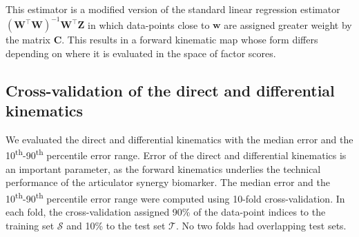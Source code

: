 \documentclass[preprint]{JASAnew}\usepackage[]{graphicx}\usepackage[]{color}
\begin{document}
This estimator is a modified version of the standard linear regression estimator $\left( \mathbf{W}^\intercal \mathbf{W} \right)^{-1} \mathbf{W}^\intercal \mathbf{Z}$ in which data-points close to $\mathbf{w}$ are assigned greater weight by the matrix $\mathbf{C}$. This results in a forward kinematic map whose form differs depending on where it is evaluated in the space of factor scores.










\subsection{Cross-validation of the direct and differential kinematics}
\label{subsec:crossval}

We evaluated the direct and differential kinematics with the median error and the 10\textsuperscript{th}-90\textsuperscript{th} percentile error range.
%
Error of the direct and differential kinematics is an important parameter, as the forward kinematics underlies the technical performance of the articulator synergy biomarker.
%
The median error and the 10\textsuperscript{th}-90\textsuperscript{th} percentile error range were computed using \num{10}-fold cross-validation. 
%
In each fold, the cross-validation assigned 90\% of the data-point indices to the training set $\mathcal{S}$ and 10\% to the test set $\mathcal{T}$.
%
No two folds had overlapping test sets. 
\end{document}

